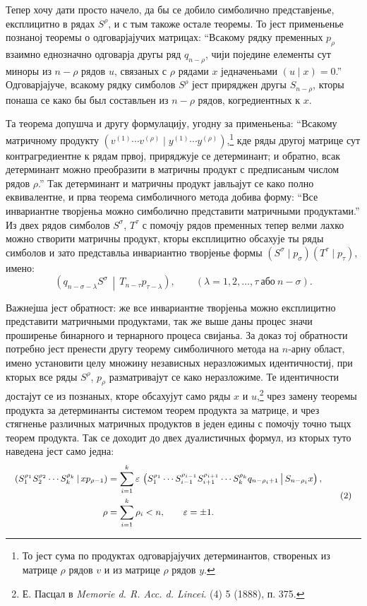﻿\documentclass[11pt]{article}
\newcommand{\eps}{\varepsilon}
\newcommand{\pair}[2]{\left(#1\,\middle|\,#2\right)}
\begin{document}
Тепер хочу дати просто начело, да бы се добило симболично представјенье, експлицитно в рядах $S^\rho$, и с тым такоже остале теоремы. То јест применьенье познаној теоремы о одговарјајучих матрицах: ``Всакому рядку пременных $p_\rho$ взаимно еднозначно одговарја другы ряд $q_{n-\rho}$, чији поједине елементы сут миноры из $n-\rho$ рядов $u$, связаных с $\rho$ рядами $x$ једначеньами $(u\mid x)=0$.'' Одговарјајуче, всакому рядку симболов $S^\rho$ јест приряджен другы $S_{n-\rho}$, кторы понаша се како бы был составльен из $n-\rho$ рядов, когредиентных к $x$.

Та теорема допушча и другу формулацију, угодну за применьеньа: ``Всакому матричному продукту $(v^{(1)}\cdots v^{(\rho)}\mid y^{(1)}\cdots y^{(\rho)})$,\footnote{То јест сума по продуктах одговарјајучих детерминантов, створеных из матрице $\rho$ рядов $v$ и из матрице $\rho$ рядов $y$.} кде ряды другој матрице сут контрагредиентне к рядам првој, приряджује се детерминант; и обратно, всак детерминант можно преобразити в матричны продукт с предписаным числом рядов $\rho$.'' Так детерминант и матричны продукт јавльајут се како полно еквивалентне, и прва теорема симболичного метода добива форму: ``Все инвариантне творјеньа можно симболично представити матричными продуктами.'' Из двех рядов симболов $S^\sigma$, $T^\tau$ с помочју рядов пременных тепер велми лахко можно створити матричны продукт, кторы експлицитно обсахује ты ряды симболов и зато представльа инвариантно творјенье формы $(S^\sigma\mid p_\sigma)(T^\tau\mid p_\tau)$, имено:
\begin{equation}
 \pair{q_{n-\sigma-\lambda}S^\sigma}{T_{n-\tau}p_{\tau-\lambda}},
 \qquad (\lambda=1,2,\ldots,\tau\ \text{або}\ n-\sigma).
\tag{1}
\end{equation}

Важнејша јест обратност: же все инвариантне творјеньа можно експлицитно представити матричными продуктами, так же выше даны процес значи проширенье бинарного и тернарного процеса свијаньа. За доказ тој обратности потребно јест пренести другу теорему симболичного метода на $n$-арну област, имено установити целу множину независных неразложимых идентичностиј, при кторых все ряды $S^\rho$, $p_\rho$ разматривајут се како неразложиме. Те идентичности достајут се из познаных, кторе обсахујут само ряды $x$ и $u$,\footnote{Е. Пасцал в \emph{Memorie d. R. Acc. d. Lincei}. (4) 5 (1888), п. 375.} чрез замену теоремы продукта за детерминанты системом теорем продукта за матрице, и чрез стягненье различных матричных продуктов в једен едины с помочју точно тыцх теорем продукта. Так се доходит до двех дуалистичных формул, из кторых туто наведена јест само једна:
\begin{equation}
\small
\begin{aligned}
 \pair{S_1^{\rho_1}S_2^{\rho_2}\cdots S_k^{\rho_k}}{x p_{\rho-1}}
 &=\sum_{i=1}^{k}\eps\,\pair{S_1^{\rho_1}\cdots S_{i-1}^{\rho_{i-1}}S_{i+1}^{\rho_{i+1}}\cdots S_k^{\rho_k}q_{n-\rho_i+1}}{S_{n-\rho_i}x},\\
 \rho&=\sum_{i=1}^{k}\rho_i<n,\qquad \eps=\pm1.
\end{aligned}
\tag{2}
\end{equation}
\end{document}
